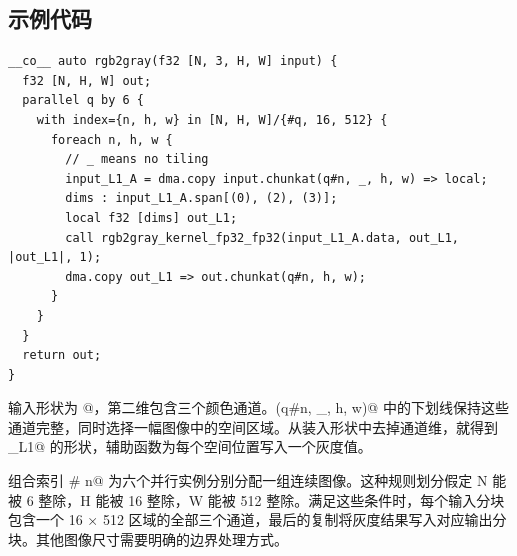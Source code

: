 \subsection*{示例代码}

\begin{lstlisting}[language=croqtile,caption={示例代码}]
__co__ auto rgb2gray(f32 [N, 3, H, W] input) {
  f32 [N, H, W] out;
  parallel q by 6 {
    with index={n, h, w} in [N, H, W]/{#q, 16, 512} {
      foreach n, h, w {
        // _ means no tiling
        input_L1_A = dma.copy input.chunkat(q#n, _, h, w) => local;
        dims : input_L1_A.span[(0), (2), (3)];
        local f32 [dims] out_L1;
        call rgb2gray_kernel_fp32_fp32(input_L1_A.data, out_L1, |out_L1|, 1);
        dma.copy out_L1 => out.chunkat(q#n, h, w);
      }
    }
  }
  return out;
}
\end{lstlisting}

输入形状为 \co@[N, 3, H, W]@，第二维包含三个颜色通道。\co@chunkat(q#n, _, h, w)@ 中的下划线保持这些通道完整，同时选择一幅图像中的空间区域。从装入形状中去掉通道维，就得到 \co@out_L1@ 的形状，辅助函数为每个空间位置写入一个灰度值。

组合索引 \co@q # n@ 为六个并行实例分别分配一组连续图像。这种规则划分假定 N 能被 6 整除，H 能被 16 整除，W 能被 512 整除。满足这些条件时，每个输入分块包含一个 16 × 512 区域的全部三个通道，最后的复制将灰度结果写入对应输出分块。其他图像尺寸需要明确的边界处理方式。
